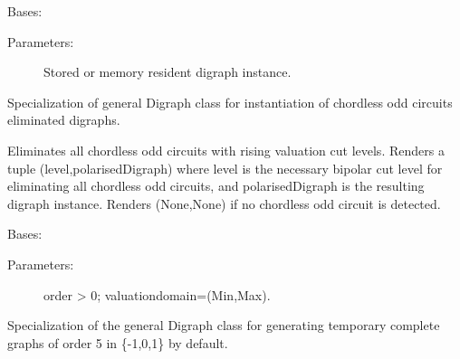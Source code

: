 \documentclass[letterpaper,10pt,english]{sphinxmanual}
\begin{document}

\begin{fulllineitems}
\label{techDoc:digraphs.CoceDigraph}
Bases: {\hyperref[techDoc:digraphs.Digraph]{\emph{}}}
\begin{description}
\item[{Parameters:}] \leavevmode
Stored or memory resident digraph instance.

\end{description}

Specialization of general Digraph class for instantiation
of chordless odd circuits eliminated digraphs.

\begin{fulllineitems}
\label{techDoc:digraphs.CoceDigraph.iterateCocElimination}
Eliminates all chordless odd circuits with rising valuation cut levels.
Renders a tuple (level,polarisedDigraph) where level is the
necessary bipolar cut level for eliminating all chordless odd circuits,
and polarisedDigraph is the resulting digraph instance.
Renders (None,None) if no chordless odd circuit is detected.

\end{fulllineitems}


\end{fulllineitems}


\begin{fulllineitems}
\label{techDoc:digraphs.CompleteDigraph}
Bases: {\hyperref[techDoc:digraphs.Digraph]{\emph{}}}
\begin{description}
\item[{Parameters:}] \leavevmode
order \textgreater{} 0; valuationdomain=(Min,Max).

\end{description}

Specialization of the general Digraph class for generating
temporary complete graphs of order 5 in \{-1,0,1\} by default.

\end{fulllineitems}
\end{document}

